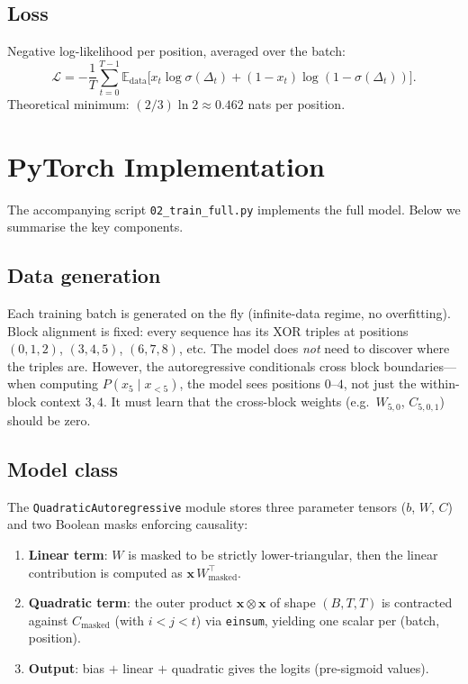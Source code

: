 \documentclass[11pt]{article}
\begin{document}
\subsection{Loss}

Negative log-likelihood per position, averaged over the batch:
\begin{equation}\label{eq:loss}
  \mathcal{L}
  = -\frac{1}{T} \sum_{t=0}^{T-1}
    \mathbb{E}_{\text{data}}\bigl[
      x_t \log\sigma(\Delta_t)
      + (1 - x_t)\log(1 - \sigma(\Delta_t))
    \bigr].
\end{equation}
Theoretical minimum: $(2/3)\ln 2 \approx 0.462$ nats per position.

\section{PyTorch Implementation}\label{sec:implementation}

The accompanying script \texttt{02\_train\_full.py} implements the full
model.  Below we summarise the key components.

\subsection{Data generation}

Each training batch is generated on the fly (infinite-data regime, no
overfitting).  Block alignment is fixed: every sequence has its XOR
triples at positions $(0,1,2)$, $(3,4,5)$, $(6,7,8)$, etc.  The model
does \emph{not} need to discover where the triples are.  However, the
autoregressive conditionals cross block boundaries---when computing
$P(x_5 \mid x_{<5})$, the model sees positions $0$--$4$, not just the
within-block context $3, 4$.  It must learn that the cross-block weights
(e.g.\ $W_{5,0}$, $C_{5,0,1}$) should be zero.

\subsection{Model class}

The \texttt{QuadraticAutoregressive} module stores three parameter
tensors ($b$, $W$, $C$) and two Boolean masks enforcing causality:
\begin{enumerate}
  \item \textbf{Linear term}: $W$ is masked to be strictly
        lower-triangular, then the linear contribution is computed as
        $\mathbf{x}\, W_{\text{masked}}^\top$.
  \item \textbf{Quadratic term}: the outer product
        $\mathbf{x} \otimes \mathbf{x}$ of shape $(B, T, T)$ is
        contracted against $C_{\text{masked}}$ (with $i < j < t$) via
        \texttt{einsum}, yielding one scalar per (batch, position).
  \item \textbf{Output}: bias $+$ linear $+$ quadratic gives the
        logits (pre-sigmoid values).
\end{enumerate}
\end{document}
